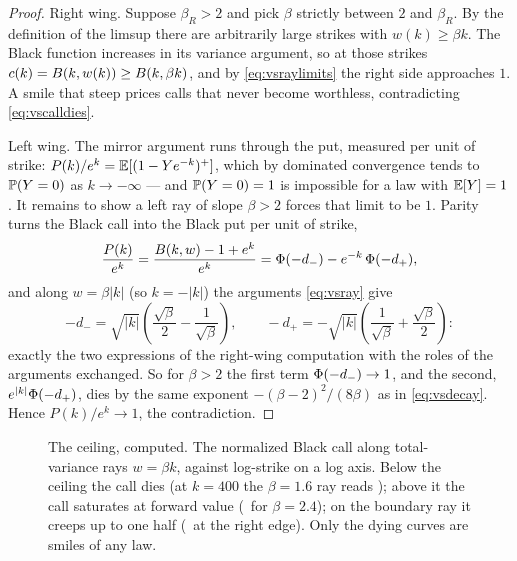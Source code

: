 \begin{proof}
Right wing.  Suppose $\beta_R>2$ and pick $\beta$ strictly between $2$
and $\beta_R$.  By the definition of the limsup there are arbitrarily
large strikes with $w(k)\ge\beta k$.  The Black function increases in
its variance argument, so at those strikes
$c(k)=B(k,w(k))\ge B(k,\beta k)$, and by
\eqref{eq:vsraylimits} the right side approaches $1$.  A smile that
steep prices calls that never become worthless, contradicting
\eqref{eq:vscalldies}.

Left wing.  The mirror argument runs through the put, measured per
unit of strike: $P(k)/e^{k}=\mathbb{E}[(1-Y e^{-k})^{+}]$, which by dominated
convergence tends to $\mathbb{P}(Y=0)$ as $k\to-\infty$ --- and
$\mathbb{P}(Y=0)=1$ is impossible for a law with $\mathbb{E}[Y]=1$.  It remains to
show a left ray of slope $\beta>2$ forces that limit to be $1$.
Parity turns the Black call into the Black put per unit of strike,
\[
\frac{P(k)}{e^{k}}
=\frac{B(k,w)-1+e^{k}}{e^{k}}
=\Phi(-d_{-})-e^{-k}\,\Phi(-d_{+}),
\]
and along $w=\beta|k|$ (so $k=-|k|$) the arguments
\eqref{eq:vsray} give
\[
-d_{-}=\sqrt{|k|}\left(\frac{\sqrt\beta}{2}-\frac{1}{\sqrt\beta}\right),
\qquad
-d_{+}=-\sqrt{|k|}\left(\frac{1}{\sqrt\beta}+\frac{\sqrt\beta}{2}\right):
\]
exactly the two expressions of the right-wing computation with the
roles of the arguments exchanged.  So for $\beta>2$ the first term
$\Phi(-d_{-})\to1$, and the second, $e^{|k|}\Phi(-d_{+})$, dies by
the same exponent $-(\beta-2)^{2}/(8\beta)$ as in
\eqref{eq:vsdecay}.  Hence $P(k)/e^{k}\to1$, the contradiction.
\end{proof}

\begin{figure}[htbp]
\centering
{}
\caption{The ceiling, computed.  The normalized Black call along
total-variance rays $w=\beta k$, against log-strike on a log axis.
Below the ceiling the call dies (at $k=400$ the $\beta=1.6$ ray reads
\MacVsRayBelowLim); above it the call saturates at forward value
(\MacVsRayAboveLim\ for $\beta=2.4$); on the boundary ray it creeps up
to one half (\MacVsRayAtLim\ at the right edge).  Only the dying
curves are smiles of any law.}
\label{fig:vsceiling}
\end{figure}

